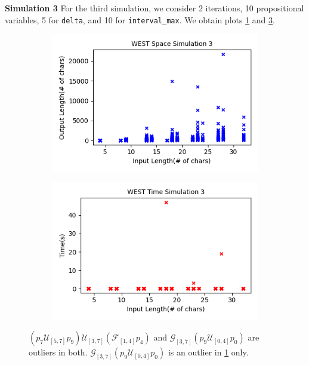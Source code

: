 \documentclass[runningheads]{llncs}
\begin{document}
\noindent\textbf{Simulation 3}
For the third simulation, we consider 2 iterations, 10 propositional variables, 5 for \texttt{delta}, and 10 for \texttt{interval\_max}. We obtain plots \ref{fig:InLenVsOutLen3} and \ref{fig:InLenVsRunTime3}.
\begin{figure}[h]
\captionsetup[subfigure]{aboveskip=-1pt,belowskip=-1pt}
    \centering
    \begin{subfigure}[h]{0.49\textwidth}
    \centering
    \includegraphics[width=\textwidth]{images/WESTspace3.png}
    \caption{}
    \label{fig:InLenVsOutLen3}
    \end{subfigure}
    \begin{subfigure}[h]{0.49 \textwidth}
    \centering
    \includegraphics[width=\textwidth]{images/WESTtime3.png}
    \caption{}
    \label{fig:InLenVsRunTime3}
    \end{subfigure}
    \caption{$(p_7 \mathcal{U}_{[5,7]} p_9) \mathcal{U}_{[3,7]} (\mathcal{F}_{[1,4]} p_4)$ and
    $\mathcal{G}_{[3,7]} (p_9 \mathcal{U}_{[0,4]} p_0)$ are outliers in both. $\mathcal{G}_{[3,7]} (p_9 \mathcal{U}_{[0,4]} p_0)$ is an outlier in \ref{fig:InLenVsOutLen3} only.}
\end{figure}
\end{document}
